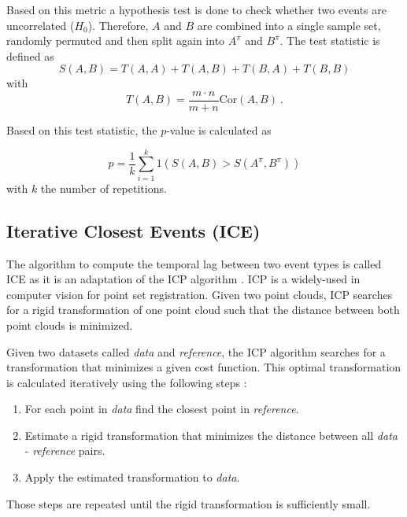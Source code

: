 \documentclass[conference]{IEEEtran}
\theoremstyle{examplestyle}
\begin{document}
Based on this metric a hypothesis test is done to check whether two events are uncorrelated (\(H_0\)).  Therefore, \(A\) and \(B\) are combined into a single sample set, randomly permuted and then split again into \(A^\pi\) and \(B^\pi\). The test statistic is defined as
\begin{equation}
	S(A, B) = T(A, A) + T(A, B) + T(B, A) + T(B, B)
\end{equation}
with
\begin{equation*}
	T(A, B) = \dfrac{m \cdot n}{m + n} \text{Cor}(A, B) ~.
\end{equation*}

Based on this test statistic, the \(p\)-value is calculated as

\begin{equation}
	p = \dfrac{1}{k} \sum_{i = 1}^k 1 \left( S(A, B) > S(A^\pi , B^\pi) \right)
\end{equation}
with \(k\) the number of repetitions.



\subsection{Iterative Closest Events (ICE)}
\label{sec:ice}

The algorithm to compute the temporal lag between two event types is called \acl{ICE} as it is an adaptation of the \ac{ICP} algorithm \cite{Besl1992}. \ac{ICP} is a widely-used in computer vision for point set registration. Given two point clouds, \ac{ICP} searches for a rigid transformation of one point cloud such that the distance between both point clouds is minimized. 

Given two datasets called \textit{data} and \textit{reference}, the \ac{ICP} algorithm searches for a transformation that minimizes a given cost function. This optimal transformation is calculated iteratively using the following steps \cite{Besl1992}:

\begin{enumerate}
	\item For each point in \textit{data} find the closest point in \textit{reference}.
	\item Estimate a rigid transformation that minimizes the distance between all \textit{data} - \textit{reference} pairs.
	\item Apply the estimated transformation to \textit{data}.
\end{enumerate}
Those steps are repeated until the rigid transformation is sufficiently small.
\end{document}
